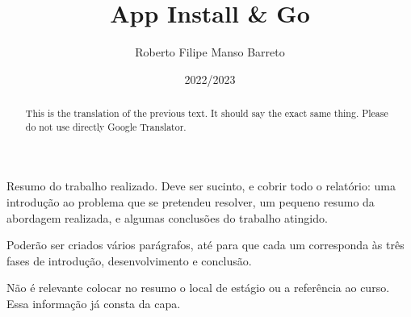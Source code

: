 \documentclass[a4paper,12pt,twoside]{book}
\title{App Install \& Go}
\author{Roberto Filipe Manso Barreto}
\date{2022/2023}
\begin{document}
\frontmatter

\maketitle


\begin{resumo}
Resumo do trabalho realizado. Deve ser sucinto, e cobrir todo o relatório: uma introdução ao problema que se pretendeu resolver, um pequeno resumo da abordagem realizada, e algumas conclusões do trabalho atingido.

Poderão ser criados vários parágrafos, até para que cada um corresponda às três fases de introdução, desenvolvimento e conclusão.

Não é relevante colocar no resumo o local de estágio ou a referência ao curso. Essa informação já consta da capa.
\end{resumo}

\begin{abstract}
This is the translation of the previous text. It should say the exact same thing. Please do not use directly Google Translator.
\end{abstract}

\begin{agradecimentos}
\end{agradecimentos}


\tableofcontents

\listoffigures

\listoftables


%

%



 
\mainmatter




%
%
%



\end{document}
